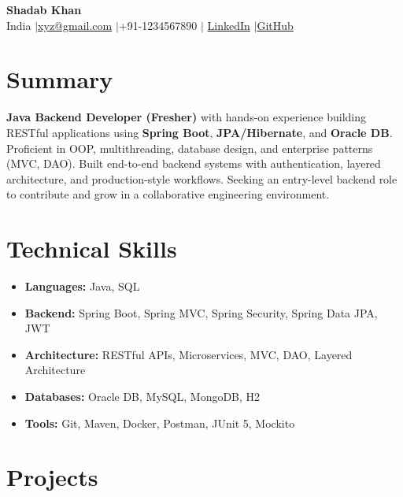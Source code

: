 \documentclass[10pt, letterpaper]{article}
\begin{document}
\begin{center}
    {\LARGE\bfseries Shadab Khan}\\[4pt]
    \small
    India \quad$|$\quad \href{mailto:xyz@gmail.com}{xyz@gmail.com} \quad$|$\quad +91-1234567890 \quad$|$\quad
    \href{https://linkedin.com/in/xyz}{LinkedIn} \quad$|$\quad \href{https://github.com/xyz}{GitHub}
\end{center}
\vspace{2pt}

\section*{Summary}
\textbf{Java Backend Developer (Fresher)} with hands-on experience building RESTful applications using \textbf{Spring Boot}, \textbf{JPA/Hibernate}, and \textbf{Oracle DB}. Proficient in OOP, multithreading, database design, and enterprise patterns (MVC, DAO). Built end-to-end backend systems with authentication, layered architecture, and production-style workflows. Seeking an entry-level backend role to contribute and grow in a collaborative engineering environment.

\section*{Technical Skills}
\begin{itemize}
    \item \textbf{Languages:} Java, SQL
    \item \textbf{Backend:} Spring Boot, Spring MVC, Spring Security, Spring Data JPA, JWT
    \item \textbf{Architecture:} RESTful APIs, Microservices, MVC, DAO, Layered Architecture
    \item \textbf{Databases:} Oracle DB, MySQL, MongoDB, H2
    \item \textbf{Tools:} Git, Maven, Docker, Postman, JUnit 5, Mockito
\end{itemize}

\section*{Projects}
\end{document}
